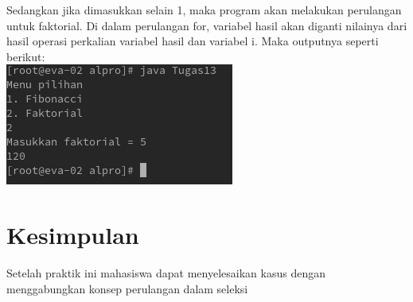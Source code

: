 \documentclass[a4paper,12pt]{article}
\begin{document}
Sedangkan jika dimasukkan selain 1,  maka program akan melakukan perulangan untuk faktorial. Di dalam perulangan for, variabel hasil akan diganti nilainya dari hasil operasi perkalian variabel hasil dan variabel i. Maka outputnya seperti berikut:\\
\includegraphics[scale=.8]{tugas3.png}

\newpage

\section{Kesimpulan}
Setelah praktik ini mahasiswa dapat menyelesaikan kasus dengan menggabungkan konsep perulangan dalam seleksi
\end{document}

